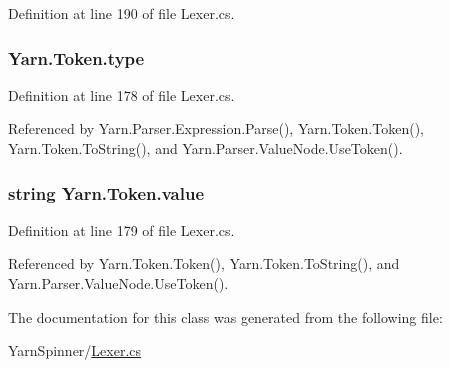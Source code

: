 Definition at line 190 of file Lexer.\-cs.

\hypertarget{a00173_a471a25da67fda0524f2375f9a882aafa}{
\subsubsection[{type}]{ Yarn.\-Token.\-type}}\label{a00173_a471a25da67fda0524f2375f9a882aafa}


Definition at line 178 of file Lexer.\-cs.



Referenced by Yarn.\-Parser.\-Expression.\-Parse(), Yarn.\-Token.\-Token(), Yarn.\-Token.\-To\-String(), and Yarn.\-Parser.\-Value\-Node.\-Use\-Token().

\hypertarget{a00173_a3df6b32d6190a639619a3f064c2154e2}{
\subsubsection[{value}]{\setlength{\rightskip}{0pt plus 5cm}string Yarn.\-Token.\-value}}\label{a00173_a3df6b32d6190a639619a3f064c2154e2}


Definition at line 179 of file Lexer.\-cs.



Referenced by Yarn.\-Token.\-Token(), Yarn.\-Token.\-To\-String(), and Yarn.\-Parser.\-Value\-Node.\-Use\-Token().



The documentation for this class was generated from the following file\-:\begin{DoxyCompactItemize}
\item 
Yarn\-Spinner/\hyperlink{a00310}{Lexer.\-cs}\end{DoxyCompactItemize}

